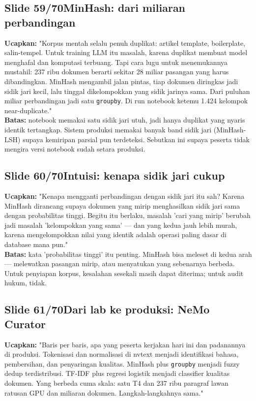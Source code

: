 \documentclass[11pt]{article}
\renewcommand{\framebox}[1]{\colorbox{acc!15}{\textcolor{acc}{\textbf{#1}}}}
\begin{document}
\subsection*{\framebox{Slide 59/70}\quad MinHash: dari miliaran perbandingan}
\textbf{Ucapkan:} "Korpus mentah selalu penuh duplikat: artikel template, boilerplate, salin-tempel. Untuk training LLM itu masalah, karena duplikat membuat model menghafal dan komputasi terbuang. Tapi cara lugu untuk menemukannya mustahil: 237 ribu dokumen berarti sekitar 28 miliar pasangan yang harus dibandingkan. MinHash mengambil jalan pintas, tiap dokumen diringkas jadi sidik jari kecil, lalu tinggal dikelompokkan yang sidik jarinya sama. Dari puluhan miliar perbandingan jadi satu \texttt{groupby}. Di run notebook ketemu 1.424 kelompok near-duplicate."\\[2pt]
\textbf{Batas:} notebook memakai satu sidik jari utuh, jadi hanya duplikat yang nyaris identik tertangkap. Sistem produksi memakai banyak band sidik jari (MinHash-LSH) supaya kemiripan parsial pun terdeteksi. Sebutkan ini supaya peserta tidak mengira versi notebook sudah setara produksi.\\[2pt]

\subsection*{\framebox{Slide 60/70}\quad Intuisi: kenapa sidik jari cukup}
\textbf{Ucapkan:} "Kenapa mengganti perbandingan dengan sidik jari itu sah? Karena MinHash dirancang supaya dokumen yang mirip menghasilkan sidik jari sama dengan probabilitas tinggi. Begitu itu berlaku, masalah 'cari yang mirip' berubah jadi masalah 'kelompokkan yang sama' — dan yang kedua jauh lebih murah, karena mengelompokkan nilai yang identik adalah operasi paling dasar di database mana pun."\\[2pt]
\textbf{Batas:} kata 'probabilitas tinggi' itu penting. MinHash bisa meleset di kedua arah — melewatkan pasangan mirip, atau menyatukan yang sebenarnya berbeda. Untuk penyiapan korpus, kesalahan sesekali masih dapat diterima; untuk audit hukum, tidak.\\[2pt]

\subsection*{\framebox{Slide 61/70}\quad Dari lab ke produksi: NeMo Curator}
\textbf{Ucapkan:} "Baris per baris, apa yang peserta kerjakan hari ini dan padanannya di produksi. Tokenisasi dan normalisasi di nvtext menjadi identifikasi bahasa, pembersihan, dan penyaringan kualitas. MinHash plus \texttt{groupby} menjadi fuzzy dedup terdistribusi. TF-IDF plus regresi logistik menjadi classifier kualitas dokumen. Yang berbeda cuma skala: satu T4 dan 237 ribu paragraf lawan ratusan GPU dan miliaran dokumen. Langkah-langkahnya sama."\\[2pt]
\end{document}
